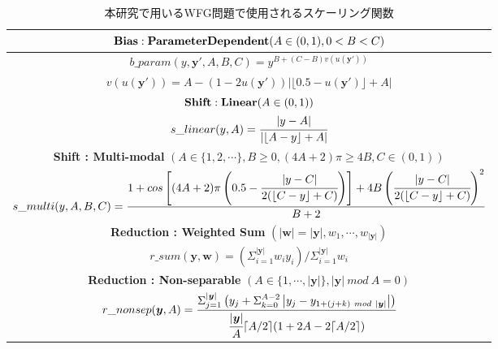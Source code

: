 \documentclass[../main/main]{subfiles}
\begin{document}
\begin{table}[htbp]
\fontsize{9.5pt}{9.5pt} \selectfont
\centering
\caption{本研究で用いるWFG問題で使用されるスケーリング関数}
\vspace{0.1cm}
\label{wfg_trans}
\begin{tabular}{|c|}
\hline 
${\bf Bias : Parameter Dependent} (A \in (0,1), 0 < B < C)$\\
\hline
$b\_param(y, \bm{y}\prime, A, B, C) = y^{B+(C-B) v ( u (\bm{y} \prime ))}$\\
$v ( u (\bm{y} \prime )) = A - (1 - 2 u (\bm{y} \prime )) \left| \lfloor 0.5 - u (\bm{y} \prime ) \rfloor + A \right|$\\
\hline
\hline
${\bf Shift : Linear} (A \in (0,1))$\\
\hline
$s\_linear(y, A) = \cfrac{|y - A|}{|\lfloor A - y \rfloor + A|}$\\
\hline
\hline
{\bf Shift : Multi-modal} $(A \in \{1, 2, \cdots\}, B \geq 0, (4A + 2)\pi \geq 4B, C \in (0,1)) $\\
\hline
$s\_multi(y, A, B, C) = \cfrac{1 + cos \left[ (4A+2) \pi \left( 0.5 - \cfrac{|y - C|}{2(\lfloor C - y \rfloor + C)} \right) \right] + 4B \left( \cfrac{|y - C|}{2(\lfloor C - y \rfloor + C) }  \right) ^ 2}{B+2}$\\
\hline
\hline
{ \bf Reduction : Weighted Sum} $(|\bm{w}| = |\bm{y}|, w_1, \cdots, w_{|\bm{y}|}) $\\
\hline
$r\_sum (\bm{y}, \bm{w}) =  \left( \Sigma^{|\bm{y}|}_{i=1} w_i y_i \right) / \Sigma^{|\bm{y}|}_{i=1} w_i$\\
\hline
\hline
{\bf Reduction : Non-separable} $(A \in \{1,  \cdots, |\bm{y}| \}, |\bm{y}| \ mod \ A = 0) $\\
\hline
$r\_nonsep (\bm{y}, A) = \cfrac{\Sigma^{|\bm{y}|}_{j=1}\left(  y_j + \Sigma^{A-2}_{k=0} \left| y_j - y_{1 + (j + k) \ mod \  | \bm{y} | } \right| \right)}{\cfrac{|\bm{y}|}{A} \lceil A / 2 \rceil (1 + 2A - 2 \lceil A / 2 \rceil)}$\\
\hline
\end{tabular}
\end{table}
\end{document}

